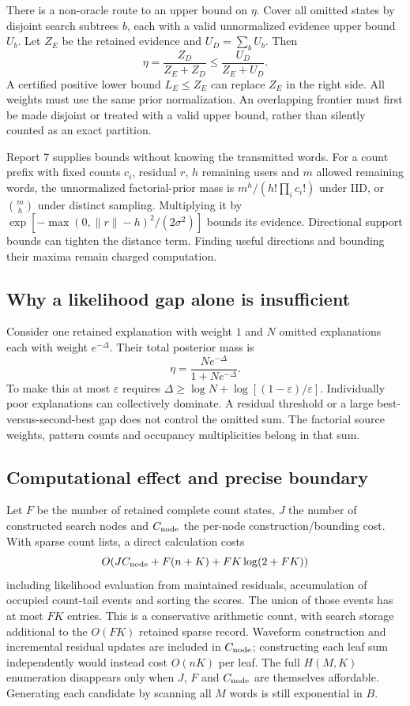 \documentclass[10pt,a4paper]{article}
\begin{document}
There is a non-oracle route to an upper bound on $\eta$. Cover all omitted states by disjoint search subtrees
$b$, each with a valid unnormalized evidence upper bound $U_b$. Let $Z_E$ be the retained evidence and
$U_D=\sum_b U_b$. Then
\begin{equation}
 \eta=\frac{Z_D}{Z_E+Z_D}\leq\frac{U_D}{Z_E+U_D}.
 \label{eq:discard-mass}
\end{equation}
A certified positive lower bound $L_E\leq Z_E$ can replace $Z_E$ in the right side. All weights must use the
same prior normalization. An overlapping frontier must first be made disjoint or treated with a valid upper
bound, rather than silently counted as an exact partition.

Report 7 supplies bounds without knowing the transmitted words. For a count prefix with fixed counts
$c_i$, residual $r$, $h$ remaining users and $m$ allowed remaining words, the unnormalized factorial-prior
mass is $m^h/(h!\prod_i c_i!)$ under IID, or $\binom mh$ under distinct sampling. Multiplying it by
$\exp[-\max(0,\|r\|-h)^2/(2\sigma^2)]$ bounds its evidence. Directional support bounds can tighten the
distance term. Finding useful directions and bounding their maxima remain charged computation.

\subsection{Why a likelihood gap alone is insufficient}
Consider one retained explanation with weight $1$ and $N$ omitted explanations each with weight $e^{-\Delta}$.
Their total posterior mass is
\[
 \eta=\frac{N e^{-\Delta}}{1+N e^{-\Delta}}.
\]
To make this at most $\varepsilon$ requires
$\Delta\geq\log N+\log[(1-\varepsilon)/\varepsilon]$. Individually poor explanations can collectively
dominate. A residual threshold or a large best-versus-second-best gap does not control the omitted sum.
The factorial source weights, pattern counts and occupancy multiplicities belong in that sum.

\subsection{Computational effect and precise boundary}
Let $F$ be the number of retained complete count states, $J$ the number of constructed search nodes and
$C_{\rm node}$ the per-node construction/bounding cost. With sparse count lists, a direct calculation costs
\[
 O\!\left(JC_{\rm node}+F(n+K)+FK\log(2+FK)\right)
\]
including likelihood evaluation from maintained residuals, accumulation of occupied count-tail events and sorting the scores.
The union of those events has at most $FK$ entries. This is a conservative arithmetic count, with search
storage additional to the $O(FK)$ retained sparse record. Waveform construction and incremental residual
updates are included in $C_{\rm node}$; constructing each leaf sum independently would instead cost $O(nK)$ per leaf.
The full $H(M,K)$ enumeration disappears only when $J$, $F$ and $C_{\rm node}$ are themselves affordable.
Generating each candidate by scanning all $M$ words is still exponential in $B$.
\end{document}
